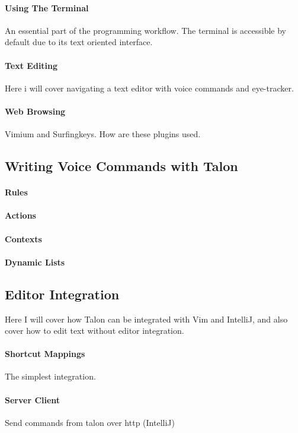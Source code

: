 \documentclass[a4paper,english]{ifimaster}
\begin{document}
\paragraph{Using The Terminal}
An essential part of the programming workflow. The terminal is accessible by default due to its text oriented interface.
\paragraph{Text Editing}
Here i will cover navigating a text editor with voice commands and eye-tracker.
\paragraph{Web Browsing}
Vimium and Surfingkeys. How are these plugins used.

\subsection{Writing Voice Commands with Talon}\label{wvc}
\paragraph{Rules}
\paragraph{Actions}
\paragraph{Contexts}
\paragraph{Dynamic Lists}

\subsection{Editor Integration}
Here I will cover how Talon can be integrated with Vim and IntelliJ, and also cover how to edit text without editor integration.
\paragraph{Shortcut Mappings}
The simplest integration. 
\paragraph{Server Client}
Send commands from talon over http (IntelliJ)
\end{document}
